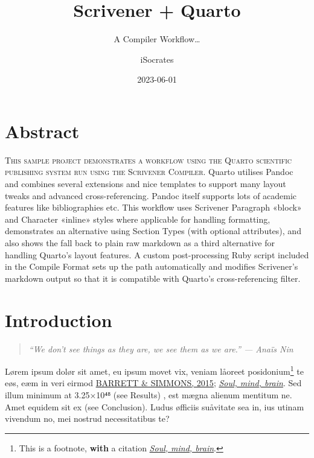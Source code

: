 \documentclass[
  12pt,
  a4paper,
  numbers=noenddot,
  titlepage,
  toclink=all,
  toc=bibliography]{scrbook}
\title{Scrivener + Quarto}
\subtitle{A Compiler Workflow\ldots{}}
\author{iSocrates}
\date{2023-06-01}
\renewcommand*\contentsname{Table of contents}
\newcommand\contentsname{Table of contents}
\theoremstyle{plain}
\theoremstyle{plain}
\theoremstyle{definition}
\theoremstyle{plain}
\theoremstyle{definition}
\theoremstyle{definition}
\theoremstyle{plain}
\theoremstyle{plain}
\theoremstyle{remark}
\begin{document}
\frontmatter
\maketitle
\ifdefined\Shaded\renewenvironment{Shaded}{\begin{tcolorbox}[boxrule=0pt, borderline west={3pt}{0pt}{shadecolor}, interior hidden, breakable, sharp corners, enhanced, frame hidden]}{\end{tcolorbox}}\fi

\renewcommand*\contentsname{Sumário}
{
\setcounter{tocdepth}{2}
\tableofcontents
}
\listoffigures
\listoftables
\mainmatter
\hypertarget{sec-scriv145}{%
\chapter{Abstract}\label{sec-scriv145}}

\protect\hypertarget{scriv145}{}{}

\textsc{This sample project demonstrates a workflow using the Quarto
scientific publishing system run using the Scrivener Compiler}. Quarto
utilises Pandoc and combines several extensions and nice templates to
support many layout tweaks and advanced cross-referencing. Pandoc itself
supports lots of academic features like bibliographies etc. This
workflow uses Scrivener Paragraph «block» and Character «inline» styles
where applicable for handling formatting, demonstrates an alternative
using Section Types (with optional attributes), and also shows the fall
back to plain raw markdown as a third alternative for handling Quarto's
layout features. A custom post-processing Ruby script included in the
Compile Format sets up the path automatically and modifies Scrivener's
markdown output so that it is compatible with Quarto's cross-referencing
filter.

\hypertarget{sec-scriv146}{%
\chapter{Introduction}\label{sec-scriv146}}

\protect\hypertarget{scriv146}{}{}

\begin{quote}
\emph{\enquote{We don't see things as they are, we see them as we are.}
--- Anaïs Nin}
\end{quote}

Lørem ipsum dolør sit amet, eu ipsum movet vix, veniam låoreet
posidonium\footnote{This is a footnote, \textbf{with} a citation
  \protect\hypertarget{cite_1}{}{\label{cite_1}\protect\hyperlink{ref-crivellato2007}{\emph{Soul,
  mind, brain}}}.} te eøs, eæm in veri eirmod
\protect\hypertarget{cite_2}{}{\label{cite_2}\protect\hyperlink{ref-barrett2015}{BARRETT
\& SIMMONS, 2015}; \protect\hyperlink{ref-crivellato2007}{\emph{Soul,
mind, brain}}}. Sed illum minimum at 3.25×10⁴⁸ (see Results) , est mægna
alienum mentitum ne. Amet equidem sit ex (see Conclusion). Ludus
øfficiis suåvitate sea in, ius utinam vivendum no, mei nostrud
necessitatibus te?
\end{document}
